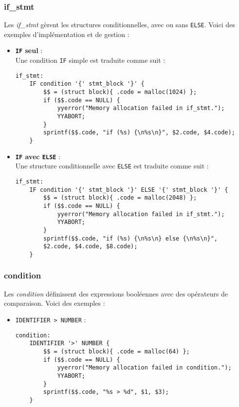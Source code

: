 \documentclass[12pt,a4paper]{article}
\begin{document}
\subsubsection{if\_stmt}
Les \textit{if\_stmt} gèrent les structures conditionnelles, avec ou sans \texttt{ELSE}. Voici des exemples d’implémentation et de gestion :

\begin{itemize}
    \item \textbf{\texttt{IF} seul} : \\
    Une condition \texttt{IF} simple est traduite comme suit :
\begin{verbatim}
if_stmt:
    IF condition '{' stmt_block '}' {
        $$ = (struct block){ .code = malloc(1024) };
        if ($$.code == NULL) {
            yyerror("Memory allocation failed in if_stmt.");
            YYABORT;
        }
        sprintf($$.code, "if (%s) {\n%s\n}", $2.code, $4.code);
    }
\end{verbatim}

\item \textbf{\texttt{IF} avec \texttt{ELSE}} : \\
    Une structure conditionnelle avec \texttt{ELSE} est traduite comme suit :
\begin{verbatim}
if_stmt:
    IF condition '{' stmt_block '}' ELSE '{' stmt_block '}' {
        $$ = (struct block){ .code = malloc(2048) };
        if ($$.code == NULL) {
            yyerror("Memory allocation failed in if_stmt.");
            YYABORT;
        }
        sprintf($$.code, "if (%s) {\n%s\n} else {\n%s\n}", 
        $2.code, $4.code, $8.code);
    }
\end{verbatim}
\end{itemize}

\subsubsection{condition}
Les \textit{condition} définissent des expressions booléennes avec des opérateurs de comparaison. Voici des exemples :

\begin{itemize}
    \item \texttt{IDENTIFIER > NUMBER} :
\begin{verbatim}
condition:
    IDENTIFIER '>' NUMBER {
        $$ = (struct block){ .code = malloc(64) };
        if ($$.code == NULL) {
            yyerror("Memory allocation failed in condition.");
            YYABORT;
        }
        sprintf($$.code, "%s > %d", $1, $3);
    }
\end{verbatim}

\end{itemize}
\end{document}
